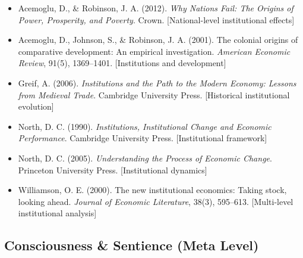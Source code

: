 \begin{itemize}

\item Acemoglu, D., \& Robinson, J. A. (2012). 
\textit{Why Nations Fail: The Origins of Power, Prosperity, and Poverty}. 
Crown.
[National-level institutional effects]

\item Acemoglu, D., Johnson, S., \& Robinson, J. A. (2001). 
The colonial origins of comparative development: An empirical investigation. 
\textit{American Economic Review}, 91(5), 1369--1401.
[Institutions and development]

\item Greif, A. (2006). 
\textit{Institutions and the Path to the Modern Economy: Lessons from Medieval Trade}. 
Cambridge University Press.
[Historical institutional evolution]

\item North, D. C. (1990). 
\textit{Institutions, Institutional Change and Economic Performance}. 
Cambridge University Press.
[Institutional framework]

\item North, D. C. (2005). 
\textit{Understanding the Process of Economic Change}. 
Princeton University Press.
[Institutional dynamics]

\item Williamson, O. E. (2000). 
The new institutional economics: Taking stock, looking ahead. 
\textit{Journal of Economic Literature}, 38(3), 595--613.
[Multi-level institutional analysis]

\end{itemize}

\subsection*{Consciousness \& Sentience (Meta Level)}

